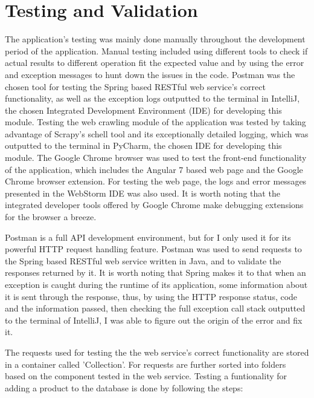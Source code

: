 \documentclass[12pt,a4paper,twoside]{report}
\begin{document}


\chapter{Testing and Validation}

The application's testing was mainly done manually throughout the development period of the application. Manual testing included using different tools to check if actual results to different operation fit the expected value and by using the error and exception messages to hunt down the issues in the code. Postman was the chosen tool for testing the Spring based RESTful web service's correct functionality, as well as the exception logs outputted to the terminal in IntelliJ, the chosen Integrated Development Environment (IDE) for developing this module. Testing the web crawling module of the application was tested by taking advantage of Scrapy's schell tool and its exceptionally detailed logging, which was outputted to the terminal in PyCharm, the chosen IDE for developing this module. The Google Chrome browser was used to test the front-end functionality of the application, which includes the Angular 7 based web page and the Google Chrome browser extension. For testing the web page, the logs and error messages presented in the WebStorm IDE was also used. It is worth noting that the integrated developer tools offered by Google Chrome make debugging extensions for the browser a breeze.

Postman is a full API development environment, but for I only used it for its powerful HTTP request handling feature. Postman was used to send requests to the Spring based RESTful web service written in Java, and to validate the responses returned by it. It is worth noting that Spring makes it to that when an exception is caught during the runtime of its application, some information about it is sent through the response, thus, by using the HTTP response status, code and the information passed, then checking the full exception call stack outputted to the terminal of IntelliJ, I was able to figure out the origin of the error and fix it.

The requests used for testing the the web service's correct functionality are stored in a container called 'Collection'. For requests are further sorted into folders based on the component tested in the web service. Testing a funtionality for adding a product to the database is done by following the steps:
\end{document}
